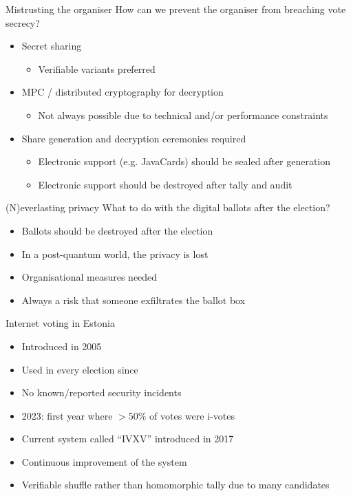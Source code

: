 \begin{frame}{Mistrusting the organiser}
  How can we prevent the organiser from breaching vote secrecy?
  \begin{itemize}[<+(1)->]
    \item Secret sharing
    \begin{itemize}
      \item Verifiable variants preferred
    \end{itemize}
    \item MPC / distributed cryptography for decryption
    \begin{itemize}
      \item Not always possible due to technical and/or performance constraints
    \end{itemize}
    \item Share generation and decryption ceremonies required
    \begin{itemize}
      \item Electronic support (e.g. JavaCards) should be sealed after generation
      \item Electronic support should be destroyed after tally and audit
    \end{itemize}
  \end{itemize} 
\end{frame}

\begin{frame}{(N)everlasting privacy}
  What to do with the digital ballots after the election?
  \begin{itemize}[<+(1)->]
    \item Ballots should be destroyed after the election
    \item In a post-quantum world, the privacy is lost
    \item Organisational measures needed
    \item Always a risk that someone exfiltrates the ballot box
  \end{itemize}
\end{frame}

\begin{frame}{Internet voting in Estonia}
  \begin{itemize}[<+(1)->]
    \item Introduced in 2005
    \item Used in every election since
    \item No known/reported security incidents
    \item 2023: first year where $> 50\%$ of votes were i-votes
    \item Current system called \enquote{IVXV} introduced in 2017
    \item Continuous improvement of the system
    \item Verifiable shuffle rather than homomorphic tally due to many candidates
  \end{itemize}
\end{frame}

